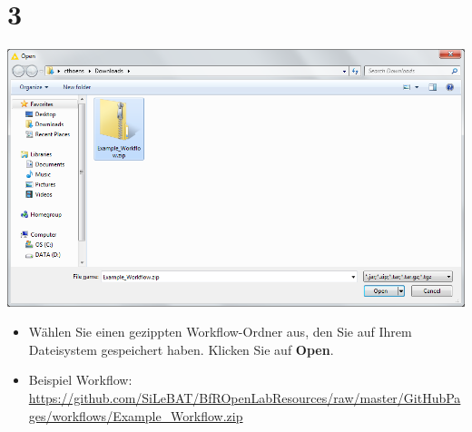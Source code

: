 \documentclass{beamer}
\begin{document}
\section{3}
\begin{frame}
	\begin{center}
  		\includegraphics[height=0.6\textheight]{3.png}
	\end{center}
	\begin{itemize}
		\item Wählen Sie einen gezippten Workflow-Ordner aus, den Sie auf Ihrem Dateisystem gespeichert haben. Klicken Sie auf \textbf{Open}.
		\item Beispiel Workflow: \url{https://github.com/SiLeBAT/BfROpenLabResources/raw/master/GitHubPages/workflows/Example_Workflow.zip}
	\end{itemize}
\end{frame}
\end{document}
